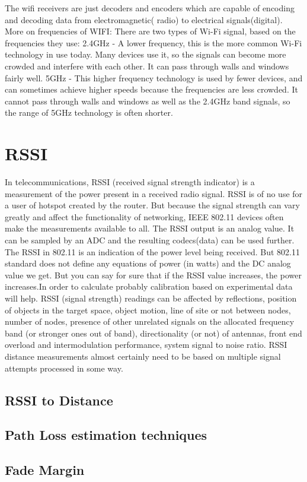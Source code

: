 \documentclass[12pt]{article}
\begin{document}
The wifi receivers are just decoders and encoders which are capable of encoding and decoding data from electromagnetic( radio) to electrical signals(digital).
More on frequencies of WIFI: There are two types of Wi-Fi signal, based on the frequencies they use:
2.4GHz - A lower frequency, this is the more common Wi-Fi technology in use today. Many devices use it, so the signals can become more crowded and interfere with each other. It can pass through walls and windows fairly well.
5GHz - This higher frequency technology is used by fewer devices, and can sometimes achieve higher speeds because the frequencies are less crowded. It cannot pass through walls and windows as well as the 2.4GHz band signals, so the range of 5GHz technology is often shorter.

\section{RSSI}
In telecommunications, RSSI (received signal strength indicator) is a measurement of the power present in a received radio signal. RSSI is of no use for a user of hotspot created by the router. But because the signal strength can vary greatly and affect the functionality of networking, IEEE 802.11 devices often make the measurements available to all. 
The RSSI output is an analog value. It can be sampled by an ADC and the resulting codecs(data) can be used further. The RSSI in 802.11 is an indication of the power level being received.
But 802.11 standard does not define any equations of power (in watts) and the DC analog value we get. But you can say for sure that if the RSSI value increases, the power increases.In order to calculate probably calibration based on experimental data will help.
RSSI (signal strength) readings can be affected by reflections, position of objects in the target space, object motion, line of site or not between nodes, number of nodes, presence of other unrelated signals on the allocated frequency band (or stronger ones out of band), directionality (or not) of antennas, front end overload and intermodulation performance, system signal to noise ratio. RSSI distance measurements almost certainly need to be based on multiple signal attempts processed in some way. 

\subsection{RSSI to Distance}
\subsection{Path Loss estimation techniques}
\subsection{Fade Margin}
\end{document}

